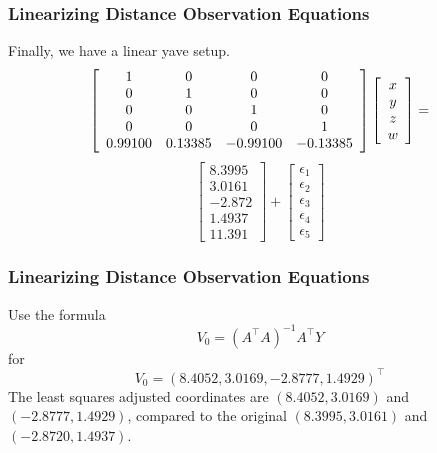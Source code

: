 \documentclass[xcolor=dvipsnames]{beamer}
\begin{document}
\begin{frame}
  \frametitle{Linearizing Distance Observation Equations}
  Finally, we have a linear yave setup.
  \begin{equation}
    \label{eq:hohchadu}
    \left[
      \begin{array}{cccc}
        1&0&0&0 \\
        0&1&0&0 \\
        0&0&1&0 \\
        0&0&0&1 \\
        0.99100&0.13385&-0.99100&-0.13385
      \end{array}\right]\left[
      \begin{array}{c}
        x \\
        y \\
        z \\
        w
      \end{array}\right]=\notag
  \end{equation}
  \begin{equation}
    \label{eq:yaericee}
    \left[
      \begin{array}{c}
8.3995 \\
3.0161 \\
-2.872 \\
        1.4937 \\
        11.391
      \end{array}\right]+\left[
      \begin{array}{c}
      \epsilon_{1} \\
      \epsilon_{2} \\
      \epsilon_{3} \\
      \epsilon_{4} \\
      \epsilon_{5}
    \end{array}\right]
  \end{equation}
\end{frame}

\begin{frame}
  \frametitle{Linearizing Distance Observation Equations}
  Use the formula
  \begin{equation}
    \label{eq:haeyahgo}
    V_{0}=(A^{\intercal}A)^{-1}A^{\intercal}Y
  \end{equation}
  for
  \begin{equation}
    \label{eq:quoiseih}
    V_{0}=(8.4052,3.0169,-2.8777,1.4929)^{\intercal}
  \end{equation}
The least squares adjusted coordinates are
$(8.4052,3.0169)$ and $(-2.8777,1.4929)$, compared to the original
$(8.3995,3.0161)$ and $(-2.8720,1.4937)$.
\end{frame}
\end{document}
